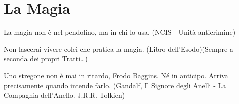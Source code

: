 \section{La Magia}\label{lamagia}

\begin{enfasi}{
La magia non è nel pendolino, ma in chi lo usa. (NCIS - Unità anticrimine)

\medskip

Non lascerai vivere colei che pratica la magia. (Libro dell'Esodo)(Sempre a seconda dei propri Tratti…)

\medskip

Uno stregone non è mai in ritardo, Frodo Baggins. Né in anticipo. Arriva precisamente quando intende farlo. (Gandalf, Il Signore degli Anelli - La Compagnia dell'Anello. J.R.R. Tolkien)} \end{enfasi}

